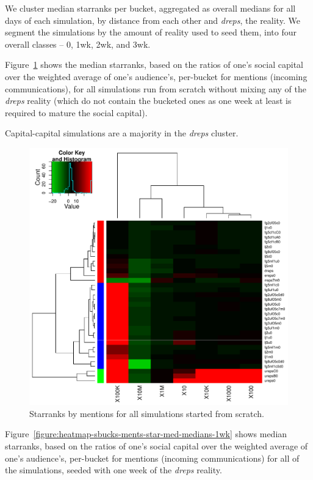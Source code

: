 \documentclass[10pt,oneside]{memoir}
\begin{document}
\begin{Spacing}{2}
We cluster median starranks per bucket, aggregated as overall medians for all days of each simulation, by distance from each other and {\itshape dreps}, the reality.  We segment the simulations by the amount of reality used to seed them, into four overall classes -- 0, 1wk, 2wk, and 3wk.


Figure~\ref{figure:heatmap-sbucks-ments-star-med-medians-0wk} shows the median starranks, based on the ratios of one's social capital over the weighted average of one's audience's, per-bucket for mentions (incoming communications), for all simulations run from scratch without mixing any of the {\itshape dreps} reality (which do not contain the bucketed ones as one week at least is required to mature the social capital).


Capital-capital simulations are a majority in the {\itshape dreps} cluster.



\begin{figure}
\begin{center}
    \includegraphics{figures/crop/heatmap-sbucks-ments-star-med-medians-0wk}
    \caption{Starranks by mentions for all simulations started from scratch.}
    \label{figure:heatmap-sbucks-ments-star-med-medians-0wk}
\end{center}
\end{figure}
Figure~\ref{figure:heatmap-sbucks-ments-star-med-medians-1wk} shows median starranks, based on the ratios of one's social capital over the weighted average of one's audience's, per-bucket for mentions (incoming communications) for all of the simulations, seeded with one week of the {\itshape dreps} reality.



\end{Spacing}
\end{document}
